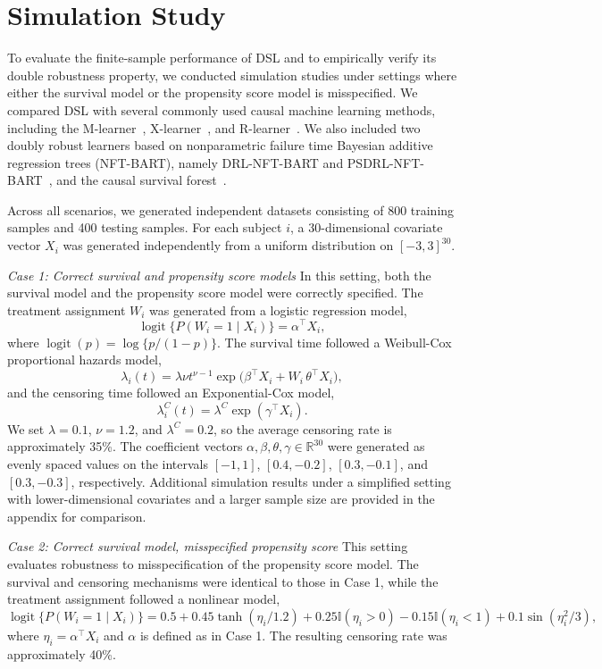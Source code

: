 \documentclass{article}
\begin{document}
\section{Simulation Study}
\label{simulation}
To evaluate the finite-sample performance of DSL and to empirically verify its double robustness property, we conducted simulation studies under settings where either the survival model or the propensity score model is misspecified. We compared DSL with several commonly used causal machine learning methods, including the M-learner~\citep{bo2025evaluating}, X-learner~\citep{kunzel2019metalearners}, and R-learner~\citep{nie2021quasi}. {We also included two doubly robust learners based on nonparametric failure time Bayesian additive regression trees (NFT-BART), namely DRL-NFT-BART and PSDRL-NFT-BART~\citep{yang2025doubly}, and  the causal survival forest~\citep{cui2023estimating}.}

Across all scenarios, we generated independent datasets consisting of 800 training samples and 400 testing samples. For each subject $i$, a 30-dimensional covariate vector $X_i$ was generated independently from a uniform distribution on $[-3,3]^{30}$.

\textit{Case 1: Correct survival and propensity score models} In this setting, both the survival model and the propensity score model were correctly specified. The treatment assignment $W_i$ was generated from a logistic regression model,
\[
\operatorname{logit}\{P(W_i = 1 \mid X_i )\} = \alpha^{\top}X_i,
\]
where $\operatorname{logit}(p) = \log\{p/(1-p)\}$. The survival time followed a Weibull-Cox proportional hazards model,
\[
\lambda_i(t) = \lambda \nu t^{\nu-1}
\exp\big(\beta^{\top}X_i + W_i\,\theta^{\top}X_i\big),
\]
and the censoring time followed an Exponential-Cox model,
\[
\lambda_i^C(t) = \lambda^C \exp(\gamma^{\top}X_i).
\]
We set $\lambda = 0.1$, $\nu = 1.2$, and $\lambda^C = 0.2$, so the average censoring rate is approximately 35\%. The coefficient vectors
$\alpha, \beta, \theta, \gamma \in \mathbb{R}^{30}$
were generated as evenly spaced values on the intervals
$[-1,1]$, $[0.4,-0.2]$, $[0.3,-0.1]$, and $[0.3,-0.3]$, respectively. {Additional simulation results under a simplified setting with lower-dimensional covariates and a larger sample size are provided in the appendix for comparison.}

\textit{Case 2: Correct survival model, misspecified propensity score} This setting evaluates robustness to misspecification of the propensity score model. The survival and censoring mechanisms were identical to those in Case 1, while the treatment assignment followed a nonlinear model,
\[
\operatorname{logit}\{P(W_i = 1 \mid X_i)\}
= 0.5
+ 0.45\tanh(\eta_i/1.2)
+ 0.25\mathbb{I}(\eta_i > 0)
- 0.15\mathbb{I}(\eta_i < 1)
+ 0.1\sin(\eta_i^2/3),
\]
where $\eta_i = \alpha^{\top}X_i$ and $\alpha$ is defined as in Case 1. The resulting censoring rate was approximately 40\%.
\end{document}
